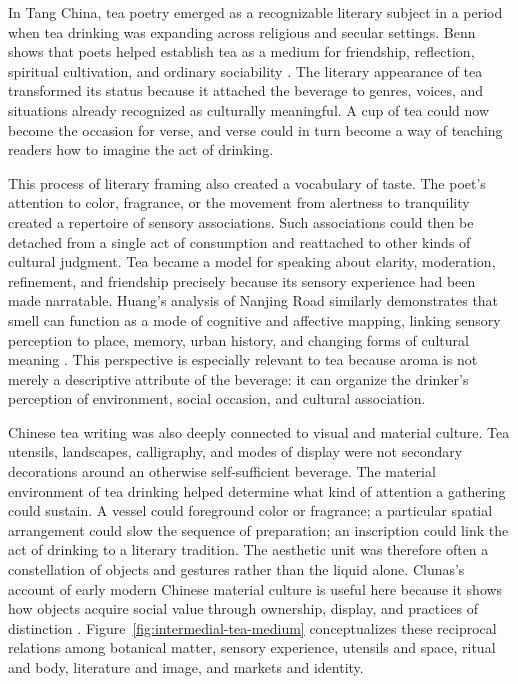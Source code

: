 \documentclass[numbers]{IntechOpen-Book}
\begin{document}
In Tang China, tea poetry emerged as a recognizable literary subject in a period when tea drinking was expanding across religious and secular settings. Benn shows that poets helped establish tea as a medium for friendship, reflection, spiritual cultivation, and ordinary sociability \cite{bennpoetry}. The literary appearance of tea transformed its status because it attached the beverage to genres, voices, and situations already recognized as culturally meaningful. A cup of tea could now become the occasion for verse, and verse could in turn become a way of teaching readers how to imagine the act of drinking.

This process of literary framing also created a vocabulary of taste. The poet's attention to color, fragrance, or the movement from alertness to tranquility created a repertoire of sensory associations. Such associations could then be detached from a single act of consumption and reattached to other kinds of cultural judgment. Tea became a model for speaking about clarity, moderation, refinement, and friendship precisely because its sensory experience had been made narratable. Huang's analysis of Nanjing Road similarly demonstrates that smell can function as a mode of cognitive and affective mapping, linking sensory perception to place, memory, urban history, and changing forms of cultural meaning \cite{huang}. This perspective is especially relevant to tea because aroma is not merely a descriptive attribute of the beverage: it can organize the drinker's perception of environment, social occasion, and cultural association.

Chinese tea writing was also deeply connected to visual and material culture. Tea utensils, landscapes, calligraphy, and modes of display were not secondary decorations around an otherwise self-sufficient beverage. The material environment of tea drinking helped determine what kind of attention a gathering could sustain. A vessel could foreground color or fragrance; a particular spatial arrangement could slow the sequence of preparation; an inscription could link the act of drinking to a literary tradition. The aesthetic unit was therefore often a constellation of objects and gestures rather than the liquid alone. Clunas's account of early modern Chinese material culture is useful here because it shows how objects acquire social value through ownership, display, and practices of distinction \cite{clunas}. Figure~\ref{fig:intermedial-tea-medium} conceptualizes these reciprocal relations among botanical matter, sensory experience, utensils and space, ritual and body, literature and image, and markets and identity.
\end{document}
